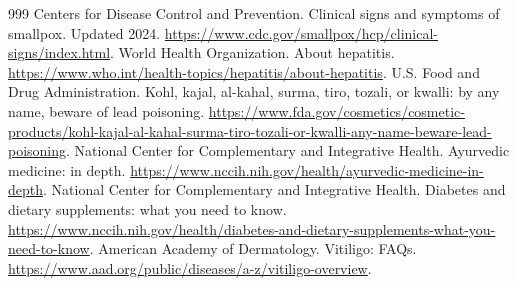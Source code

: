 \documentclass[11pt,oneside]{book}
\begin{document}
\begin{thebibliography}{999}
Centers for Disease Control and Prevention. Clinical signs and symptoms of smallpox. Updated 2024. \url{https://www.cdc.gov/smallpox/hcp/clinical-signs/index.html}.
World Health Organization. About hepatitis. \url{https://www.who.int/health-topics/hepatitis/about-hepatitis}.
U.S. Food and Drug Administration. Kohl, kajal, al-kahal, surma, tiro, tozali, or kwalli: by any name, beware of lead poisoning. \url{https://www.fda.gov/cosmetics/cosmetic-products/kohl-kajal-al-kahal-surma-tiro-tozali-or-kwalli-any-name-beware-lead-poisoning}.
National Center for Complementary and Integrative Health. Ayurvedic medicine: in depth. \url{https://www.nccih.nih.gov/health/ayurvedic-medicine-in-depth}.
National Center for Complementary and Integrative Health. Diabetes and dietary supplements: what you need to know. \url{https://www.nccih.nih.gov/health/diabetes-and-dietary-supplements-what-you-need-to-know}.
American Academy of Dermatology. Vitiligo: FAQs. \url{https://www.aad.org/public/diseases/a-z/vitiligo-overview}.


\end{thebibliography}
\end{document}
